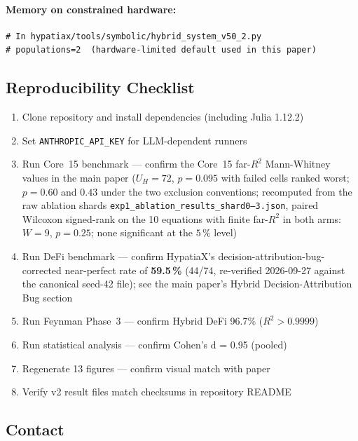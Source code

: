\documentclass[twoside,11pt]{article}
\begin{document}
\paragraph{Memory on constrained hardware:}
\begin{small}
\begin{verbatim}
# In hypatiax/tools/symbolic/hybrid_system_v50_2.py
# populations=2  (hardware-limited default used in this paper)
\end{verbatim}
\end{small}

\subsection{Reproducibility Checklist}

\begin{enumerate}
\item Clone repository and install dependencies (including Julia 1.12.2)
\item Set \texttt{ANTHROPIC\_API\_KEY} for LLM-dependent runners
\item Run Core~15 benchmark — confirm the Core~15 far-$R^2$ Mann-Whitney values in the main paper ($U_H=72$, $p=0.095$ with failed cells ranked worst; $p=0.60$ and $0.43$ under the two exclusion conventions; recomputed from the raw ablation shards \texttt{exp1\_ablation\_results\_shard0--3.json}, paired Wilcoxon signed-rank on the 10 equations with finite far-$R^2$ in both arms: $W=9$, $p=0.25$; none significant at the $5\,\%$ level)
\item Run DeFi benchmark --- confirm HypatiaX's decision-attribution-bug-corrected
  near-perfect rate of \textbf{59.5\,\%} (44/74, re-verified
  2026-09-27 against the canonical seed-42 file); see the main paper's Hybrid
  Decision-Attribution Bug section
\item Run Feynman Phase~3 — confirm Hybrid DeFi 96.7\% ($R^2>0.9999$)
\item Run statistical analysis — confirm Cohen's d = 0.95 (pooled)
\item Regenerate 13 figures — confirm visual match with paper
\item Verify v2 result files match checksums in repository README
\end{enumerate}

\subsection{Contact}
\end{document}
